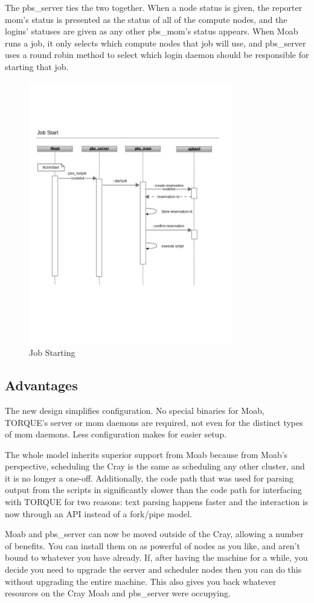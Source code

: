 The pbs_server ties the two together. When a node status is given, the reporter
mom's status is presented as the status of all of the compute nodes, and the
logins' statuses are given as any other pbs_mom's status appears. When Moab
runs a job, it only selects which compute nodes that job will use, and
pbs_server uses a round robin method to select which login daemon should be
responsible for starting that job.

\begin{figure}
  \centering
  \includegraphics[width=3.5in]{figures/job-start.pdf}
  \caption{Job Starting}\label{fig:starting}
\end{figure}

\subsection{Advantages}

The new design simplifies configuration. No special binaries for Moab, TORQUE's
server or mom daemons are required, not even for the distinct types of mom
daemons. Less configuration makes for easier setup.

The whole model inherits superior support from Moab because from Moab's
perspective, scheduling the Cray is the same as scheduling any other cluster,
and it is no longer a one-off. Additionally, the code path that was used for
parsing output from the scripts in significantly slower than the code path for
interfacing with TORQUE for two reasons: text parsing happens faster and the
interaction is now through an API instead of a fork/pipe model.

Moab and pbs_server can now be moved outside of the Cray, allowing a number of
benefits. You can install them on as powerful of nodes as you like, and aren't
bound to whatever you have already.  If, after having the machine for a while,
you decide you need to upgrade the server and scheduler nodes then you can do
this without upgrading the entire machine. This also gives you back whatever
resources on the Cray Moab and pbs_server were occupying.

